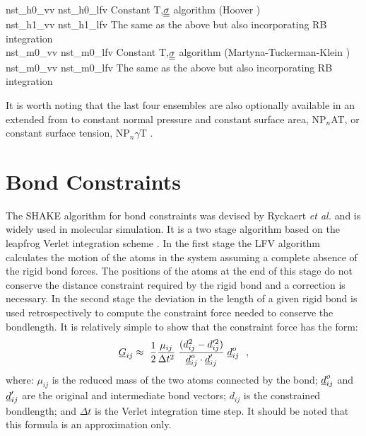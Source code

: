 \begin{tabbing}
{\sc nst\_h0\_vv}     \> {\sc nst\_h0\_lfv} \> Constant T,$\mbox{$\underline{\underline{\bf \sigma}}$}$ algorithm (Hoover \cite{hoover-85a}) \\
{\sc nst\_h1\_vv}     \> {\sc nst\_h1\_lfv} \> The same as the above but also incorporating RB integration \\
{\sc nst\_m0\_vv}     \> {\sc nst\_m0\_lfv} \> Constant T,$\mbox{$\underline{\underline{\bf \sigma}}$}$ algorithm (Martyna-Tuckerman-Klein \cite{martyna-96a}) \\
{\sc nst\_m0\_vv}     \> {\sc nst\_m0\_lfv} \> The same as the above but also incorporating RB integration
\end{tabbing}

It is worth noting that the last four ensembles are also optionally
available in an extended from to constant normal pressure and
constant surface area, NP$_{n}$AT, or constant surface tension,
NP$_{n}\gamma$T \cite{ikeguchi-04a}.

\section{Bond Constraints}
\label{shake-rattle}

The SHAKE algorithm  for bond constraints
was devised by Ryckaert {\em et al.} \cite{ryckaert-77a} and is
widely used in molecular simulation.  It is a two stage algorithm
based on the leapfrog Verlet integration
scheme \cite{allen-89a}.  In the first stage the LFV algorithm
calculates the motion of the atoms in the system assuming a
complete absence of the rigid bond
forces. The positions of the atoms at the end of this stage
do not conserve the distance constraint required by the
rigid bond and a correction is necessary.
In the second stage the deviation in the length of a given
rigid bond is used retrospectively to
compute the constraint force needed to conserve the bondlength.
It is relatively simple to show that the constraint force has the form:
\begin{equation}
\mbox{$\underline{G}$}_{ij} \approx\ {1 \over 2} {\mu_{ij} \over \Delta t^{2}} \;
{(d_{ij}^{2} - d_{ij}'^{2}) \over \mbox{$\underline{d}$}_{ij}^{o} \cdot
\mbox{$\underline{d}$}_{ij}'} \; \mbox{$\underline{d}$}_{ij}^{o}~~, \label{g12}
\end{equation}
where: $\mu_{ij}$ is the reduced mass of the two atoms connected
by the bond; $\mbox{$\underline{d}$}_{ij}^{o}$ and $\mbox{$\underline{d}$}_{ij}'$ are the
original and intermediate bond vectors; $d_{ij}$ is the
constrained bondlength; and $\Delta t$ is the
Verlet integration time step.  It should
be noted that this formula is an approximation only.

